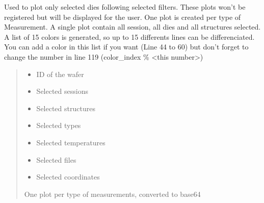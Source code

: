 \documentclass[letterpaper,10pt,english]{sphinxmanual}
\begin{document}
\begin{fulllineitems}
\label{\detokenize{plot_and_powerpoint:plot_and_powerpoint.plot_wanted_matrices}}
\pysigstartsignatures
{}
\pysigstopsignatures
\sphinxAtStartPar
Used to plot only selected dies following selected filters. These plots won’t be registered but will be displayed for the user.
One plot is created per type of Measurement.
A single plot contain all session, all dies and all structures selected. A list of 15 colors is generated, so up to 15 differents lines can be differenciated.
You can add a color in this list if you want (Line 44 to 60) but don’t forget to change the number in line 119 (color\_index \% \textless{}this number\textgreater{})
\begin{quote}\begin{description}
\begin{itemize}
\item {} 
\sphinxAtStartPar
{} \textendash{} ID of the wafer

\item {} 
\sphinxAtStartPar
{} \textendash{} Selected sessions

\item {} 
\sphinxAtStartPar
{} \textendash{} Selected structures

\item {} 
\sphinxAtStartPar
{} \textendash{} Selected types

\item {} 
\sphinxAtStartPar
{} \textendash{} Selected temperatures

\item {} 
\sphinxAtStartPar
{} \textendash{} Selected files

\item {} 
\sphinxAtStartPar
{} \textendash{} Selected coordinates

\end{itemize}

\sphinxAtStartPar
One plot per type of measurements, converted to base64

\end{description}\end{quote}

\end{fulllineitems}
\end{document}
